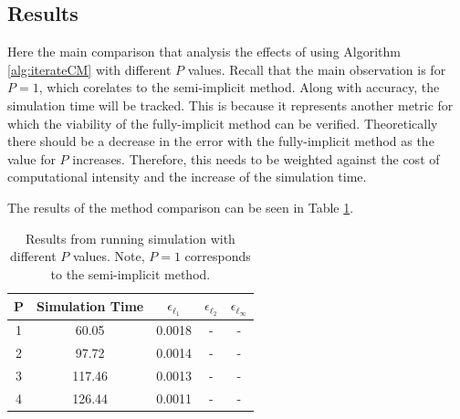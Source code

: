 %
%
%

\subsection{Results}
  Here the main comparison that analysis the effects of using Algorithm \ref{alg:iterateCM} with different $P$ values.
  Recall that the main observation is for $P = 1$, which corelates to the semi-implicit method. 
  Along with accuracy, the simulation time will be tracked.
  This is because it represents another metric for which the viability of the fully-implicit method can be verified.
  Theoretically there should be a decrease in the error with the fully-implicit method as the value for $P$ increases.
  Therefore, this needs to be weighted against the cost of computational intensity and the increase of the simulation time.

  
  The results of the method comparison can be seen in Table \ref{tab:tolerance_comparison}.
  
  \begin{table}[h!tb]
    \centering
    \begin{tabular}{|c|c|c|c|c|}
      \hline
      P & Simulation Time & $\epsilon_{\ell_1}$ & $\epsilon_{\ell_2}$ & $\epsilon_{\ell_\infty}$  \\
      \hline
      1& 60.05 & 0.0018 & - & - \\
      2& 97.72  & 0.0014 & - & - \\
      3& 117.46 & 0.0013 & - & - \\
      4& 126.44 & 0.0011& - & - \\
      \hline
    \end{tabular}
    \caption{Results from running simulation with different $P$ values. Note, $P = 1$ corresponds to the semi-implicit method.}
    \label{tab:tolerance_comparison}
  \end{table}
  
